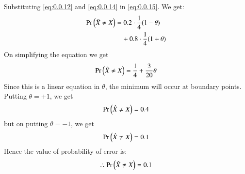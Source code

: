 Substituting \eqref{eq:0.0.12} and \eqref{eq:0.0.14} in \eqref{eq:0.0.15}. We get:
\begin{align}
\nonumber
    \Pr\left(\hat{X} \neq X\right) &= 0.2\cdot \frac{1}{4}(1-\theta) \\
    & \quad+ 0.8\cdot \frac{1}{4}(1+\theta)
\end{align}
On simplifying the equation we get
\begin{align}
    \Pr\left(\hat{X} \neq X\right) = \frac{1}{4} + \frac{3}{20}\theta
\end{align}
Since this is a linear equation in $\theta$, the minimum will occur at boundary points.
Putting $\theta = +1$, we get
\begin{align}
    \Pr\left(\hat{X} \neq X\right) = 0.4
\end{align}
but on putting $\theta = -1$, we get
\begin{align}
    \Pr\left(\hat{X} \neq X\right) = 0.1
\end{align}
Hence the value of probability of error is:
\begin{align}
    \therefore \Pr\left(\hat{X} \neq X\right) = 0.1
\end{align}

